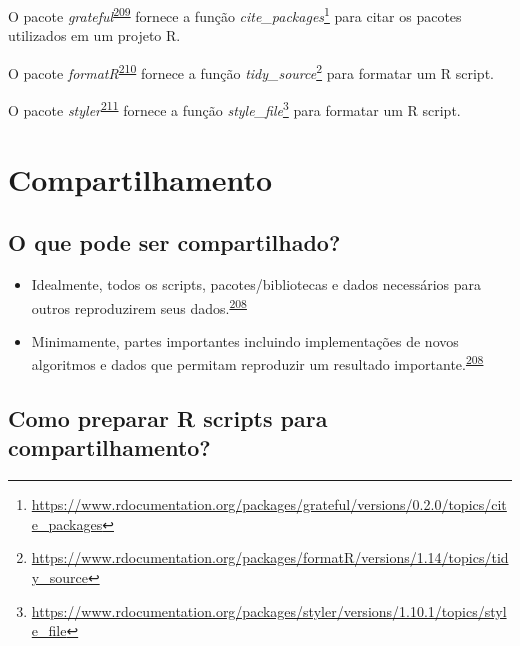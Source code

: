 \documentclass[
  a4paper,
]{book}
\renewcommand{\href}[2]{#2\footnote{\url{#1}}}
\newenvironment{infobox}[1]
  {
  \begin{itemize}
  \renewcommand{\labelitemi}{
    \raisebox{-.7\height}[0pt][0pt]{
      {\setkeys{Gin}{width=3em,keepaspectratio}
        \texttt{[image: \#1]}}
    }
  }
  \setlength{\fboxsep}{1em}
  \begin{blackbox}
  \item
  }
  {
  \end{blackbox}
  \end{itemize}
  }
\begin{document}
\begin{infobox}{images/Rlogo}
O pacote \emph{grateful}\textsuperscript{\protect\hyperlink{ref-grateful}{209}} fornece a função \href{https://www.rdocumentation.org/packages/grateful/versions/0.2.0/topics/cite_packages}{\emph{cite\_packages}} para citar os pacotes utilizados em um projeto R.

\end{infobox}

\begin{infobox}{images/Rlogo}
O pacote \emph{formatR}\textsuperscript{\protect\hyperlink{ref-formatR}{210}} fornece a função \href{https://www.rdocumentation.org/packages/formatR/versions/1.14/topics/tidy_source}{\emph{tidy\_source}} para formatar um R script.

\end{infobox}

\begin{infobox}{images/Rlogo}
O pacote \emph{styler}\textsuperscript{\protect\hyperlink{ref-styler}{211}} fornece a função \href{https://www.rdocumentation.org/packages/styler/versions/1.10.1/topics/style_file}{\emph{style\_file}} para formatar um R script.

\end{infobox}

\hypertarget{compartilhamento}{%
\section{Compartilhamento}\label{compartilhamento}}

\hypertarget{o-que-pode-ser-compartilhado}{%
\subsection{O que pode ser compartilhado?}\label{o-que-pode-ser-compartilhado}}

\begin{itemize}
\item
  Idealmente, todos os scripts, pacotes/bibliotecas e dados necessários para outros reproduzirem seus dados.\textsuperscript{\protect\hyperlink{ref-Eglen2017}{208}}
\item
  Minimamente, partes importantes incluindo implementações de novos algoritmos e dados que permitam reproduzir um resultado importante.\textsuperscript{\protect\hyperlink{ref-Eglen2017}{208}}
\end{itemize}

\hypertarget{como-preparar-r-scripts-para-compartilhamento}{%
\subsection{Como preparar R scripts para compartilhamento?}\label{como-preparar-r-scripts-para-compartilhamento}}
\end{document}
